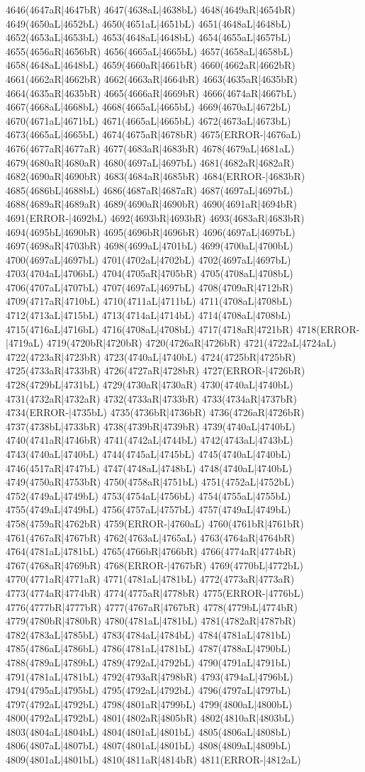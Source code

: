 4646(4647aR|4647bR) 4647(4638aL|4638bL) 4648(4649aR|4654bR) 4649(4650aL|4652bL) 4650(4651aL|4651bL) 4651(4648aL|4648bL) 4652(4653aL|4653bL) 4653(4648aL|4648bL) 4654(4655aL|4657bL) 4655(4656aR|4656bR) 4656(4665aL|4665bL) 4657(4658aL|4658bL) 4658(4648aL|4648bL) 4659(4660aR|4661bR) 4660(4662aR|4662bR) 4661(4662aR|4662bR) 4662(4663aR|4664bR) 4663(4635aR|4635bR) 4664(4635aR|4635bR) 4665(4666aR|4669bR) 4666(4674aR|4667bL) 4667(4668aL|4668bL) 4668(4665aL|4665bL) 4669(4670aL|4672bL) 4670(4671aL|4671bL) 4671(4665aL|4665bL) 4672(4673aL|4673bL) 4673(4665aL|4665bL) 4674(4675aR|4678bR) 4675(ERROR-|4676aL) 4676(4677aR|4677aR) 4677(4683aR|4683bR) 4678(4679aL|4681aL) 4679(4680aR|4680aR) 4680(4697aL|4697bL) 4681(4682aR|4682aR) 4682(4690aR|4690bR) 4683(4684aR|4685bR) 4684(ERROR-|4683bR) 4685(4686bL|4688bL) 4686(4687aR|4687aR) 4687(4697aL|4697bL) 4688(4689aR|4689aR) 4689(4690aR|4690bR) 4690(4691aR|4694bR) 4691(ERROR-|4692bL) 4692(4693bR|4693bR) 4693(4683aR|4683bR) 4694(4695bL|4690bR) 4695(4696bR|4696bR) 4696(4697aL|4697bL) 4697(4698aR|4703bR) 4698(4699aL|4701bL) 4699(4700aL|4700bL) 4700(4697aL|4697bL) 4701(4702aL|4702bL) 4702(4697aL|4697bL) 4703(4704aL|4706bL) 4704(4705aR|4705bR) 4705(4708aL|4708bL) 4706(4707aL|4707bL) 4707(4697aL|4697bL) 4708(4709aR|4712bR) 4709(4717aR|4710bL) 4710(4711aL|4711bL) 4711(4708aL|4708bL) 4712(4713aL|4715bL) 4713(4714aL|4714bL) 4714(4708aL|4708bL) 4715(4716aL|4716bL) 4716(4708aL|4708bL) 4717(4718aR|4721bR) 4718(ERROR-|4719aL) 4719(4720bR|4720bR) 4720(4726aR|4726bR) 4721(4722aL|4724aL) 4722(4723aR|4723bR) 4723(4740aL|4740bL) 4724(4725bR|4725bR) 4725(4733aR|4733bR) 4726(4727aR|4728bR) 4727(ERROR-|4726bR) 4728(4729bL|4731bL) 4729(4730aR|4730aR) 4730(4740aL|4740bL) 4731(4732aR|4732aR) 4732(4733aR|4733bR) 4733(4734aR|4737bR) 4734(ERROR-|4735bL) 4735(4736bR|4736bR) 4736(4726aR|4726bR) 4737(4738bL|4733bR) 4738(4739bR|4739bR) 4739(4740aL|4740bL) 4740(4741aR|4746bR) 4741(4742aL|4744bL) 4742(4743aL|4743bL) 4743(4740aL|4740bL) 4744(4745aL|4745bL) 4745(4740aL|4740bL) 4746(4517aR|4747bL) 4747(4748aL|4748bL) 4748(4740aL|4740bL) 4749(4750aR|4753bR) 4750(4758aR|4751bL) 4751(4752aL|4752bL) 4752(4749aL|4749bL) 4753(4754aL|4756bL) 4754(4755aL|4755bL) 4755(4749aL|4749bL) 4756(4757aL|4757bL) 4757(4749aL|4749bL) 4758(4759aR|4762bR) 4759(ERROR-|4760aL) 4760(4761bR|4761bR) 4761(4767aR|4767bR) 4762(4763aL|4765aL) 4763(4764aR|4764bR) 4764(4781aL|4781bL) 4765(4766bR|4766bR) 4766(4774aR|4774bR) 4767(4768aR|4769bR) 4768(ERROR-|4767bR) 4769(4770bL|4772bL) 4770(4771aR|4771aR) 4771(4781aL|4781bL) 4772(4773aR|4773aR) 4773(4774aR|4774bR) 4774(4775aR|4778bR) 4775(ERROR-|4776bL) 4776(4777bR|4777bR) 4777(4767aR|4767bR) 4778(4779bL|4774bR) 4779(4780bR|4780bR) 4780(4781aL|4781bL) 4781(4782aR|4787bR) 4782(4783aL|4785bL) 4783(4784aL|4784bL) 4784(4781aL|4781bL) 4785(4786aL|4786bL) 4786(4781aL|4781bL) 4787(4788aL|4790bL) 4788(4789aL|4789bL) 4789(4792aL|4792bL) 4790(4791aL|4791bL) 4791(4781aL|4781bL) 4792(4793aR|4798bR) 4793(4794aL|4796bL) 4794(4795aL|4795bL) 4795(4792aL|4792bL) 4796(4797aL|4797bL) 4797(4792aL|4792bL) 4798(4801aR|4799bL) 4799(4800aL|4800bL) 4800(4792aL|4792bL) 4801(4802aR|4805bR) 4802(4810aR|4803bL) 4803(4804aL|4804bL) 4804(4801aL|4801bL) 4805(4806aL|4808bL) 4806(4807aL|4807bL) 4807(4801aL|4801bL) 4808(4809aL|4809bL) 4809(4801aL|4801bL) 4810(4811aR|4814bR) 4811(ERROR-|4812aL) 